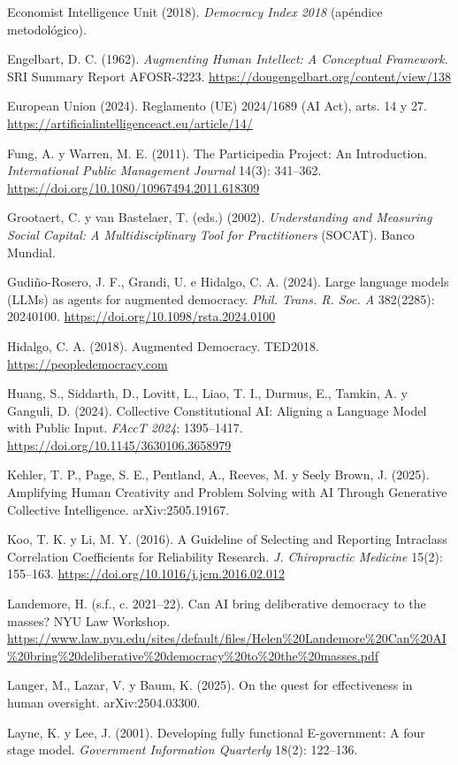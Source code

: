 \documentclass[11pt,a4paper]{article}
\begin{document}
Economist Intelligence Unit (2018). \emph{Democracy Index 2018} (apéndice metodológico).

Engelbart, D. C. (1962). \emph{Augmenting Human Intellect: A Conceptual Framework}. SRI Summary Report AFOSR-3223. \url{https://dougengelbart.org/content/view/138}

European Union (2024). Reglamento (UE) 2024/1689 (AI Act), arts. 14 y 27. \url{https://artificialintelligenceact.eu/article/14/}

Fung, A. y Warren, M. E. (2011). The Participedia Project: An Introduction. \emph{International Public Management Journal} 14(3): 341--362. \url{https://doi.org/10.1080/10967494.2011.618309}

Grootaert, C. y van Bastelaer, T. (eds.) (2002). \emph{Understanding and Measuring Social Capital: A Multidisciplinary Tool for Practitioners} (SOCAT). Banco Mundial.

Gudiño-Rosero, J. F., Grandi, U. e Hidalgo, C. A. (2024). Large language models (LLMs) as agents for augmented democracy. \emph{Phil. Trans. R. Soc. A} 382(2285): 20240100. \url{https://doi.org/10.1098/rsta.2024.0100}

Hidalgo, C. A. (2018). Augmented Democracy. TED2018. \url{https://peopledemocracy.com}

Huang, S., Siddarth, D., Lovitt, L., Liao, T. I., Durmus, E., Tamkin, A. y Ganguli, D. (2024). Collective Constitutional AI: Aligning a Language Model with Public Input. \emph{FAccT 2024}: 1395--1417. \url{https://doi.org/10.1145/3630106.3658979}

Kehler, T. P., Page, S. E., Pentland, A., Reeves, M. y Seely Brown, J. (2025). Amplifying Human Creativity and Problem Solving with AI Through Generative Collective Intelligence. arXiv:2505.19167.

Koo, T. K. y Li, M. Y. (2016). A Guideline of Selecting and Reporting Intraclass Correlation Coefficients for Reliability Research. \emph{J. Chiropractic Medicine} 15(2): 155--163. \url{https://doi.org/10.1016/j.jcm.2016.02.012}

Landemore, H. (s.f., c. 2021--22). Can AI bring deliberative democracy to the masses? NYU Law Workshop. \url{https://www.law.nyu.edu/sites/default/files/Helen\%20Landemore\%20Can\%20AI\%20bring\%20deliberative\%20democracy\%20to\%20the\%20masses.pdf}

Langer, M., Lazar, V. y Baum, K. (2025). On the quest for effectiveness in human oversight. arXiv:2504.03300.

Layne, K. y Lee, J. (2001). Developing fully functional E-government: A four stage model. \emph{Government Information Quarterly} 18(2): 122--136.
\end{document}
